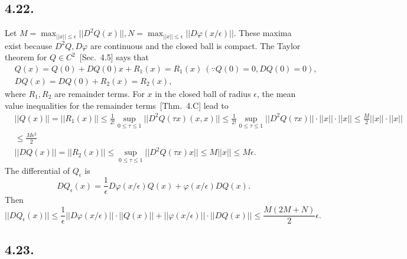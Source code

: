 \documentclass[a4paper,11pt,fleqn]{article}
\begin{document}
\subsection{4.22.}
 Let $M=\max_{||x||\le \epsilon}{||D^2Q(x)||}, N = \max_{||x||\le \epsilon}{||D\varphi(x/\epsilon)||}$. These maxima exist because $D^2Q, D\varphi$ are continuous and the closed ball is compact. The Taylor theorem for $Q\in C^2$~[Sec.~4.5]\cite{zeidler2012applied} says that
\begin{align}
    &Q(x) = Q(0) + DQ(0)x + R_1(x) = R_1(x) \ (\because Q(0)=0, DQ(0)=0), \\
    &DQ(x) = DQ(0) + R_2(x) = R_2(x),
\end{align}
where $R_1, R_2$ are remainder terms. For $x$ in the closed ball of radius $\epsilon$, the mean value inequalities for the remainder terms~[Thm.~4.C]\cite{zeidler2012applied} lead to 
\begin{align}
    &||Q(x)|| = ||R_1(x)|| \le \frac{1}{2!}\sup_{0\le\tau\le 1}{||D^2Q(\tau x)(x,x)||}\le \frac{1}{2!}\sup_{0\le\tau\le 1}{||D^2Q(\tau x)}|| \cdot ||x|| \cdot ||x|| \le \frac{M}{2}||x|| \cdot ||x|| \nonumber \\
    & \le \frac{M\epsilon^2}{2} \\
    &||DQ(x)|| = ||R_2(x)|| \le \sup_{0\le\tau\le 1}{||D^2Q(\tau x)x||} \le M ||x|| \le M\epsilon.
\end{align}
The differential of $Q_\epsilon$ is 
\begin{equation}
    DQ_\epsilon(x) = \frac{1}{\epsilon}D\varphi(x/\epsilon)Q(x) + \varphi(x/\epsilon)DQ(x).
\end{equation}
Then 
\begin{equation}
    ||DQ_\epsilon(x)|| \le \frac{1}{\epsilon} || D\varphi(x/\epsilon) ||\cdot ||Q(x)|| + ||\varphi(x/\epsilon)||\cdot ||DQ(x)||
    \le \frac{M(2M+N)}{2}\epsilon.
\end{equation}
\hruleskip

\subsection{4.23.}

\end{document}
